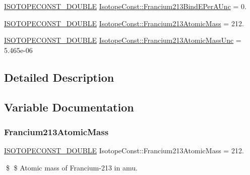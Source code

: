 \begin{DoxyCompactItemize}
\mbox{\hyperlink{group___isotope_const-_macros_ga8f45a7272ce02c0b4c65c44636ed719a}{I\+S\+O\+T\+O\+P\+E\+C\+O\+N\+S\+T\+\_\+\+D\+O\+U\+B\+LE}} \mbox{\hyperlink{group___isotope_const-_francium-_fr213_gad89a4eb2699a269c22ce779ab6a8e75a}{Isotope\+Const\+::\+Francium213\+Bind\+E\+Per\+A\+Unc}} = 0.
\item 
\mbox{\hyperlink{group___isotope_const-_macros_ga8f45a7272ce02c0b4c65c44636ed719a}{I\+S\+O\+T\+O\+P\+E\+C\+O\+N\+S\+T\+\_\+\+D\+O\+U\+B\+LE}} \mbox{\hyperlink{group___isotope_const-_francium-_fr213_ga805c92c86ed7ff7be7f1b51050e8eedf}{Isotope\+Const\+::\+Francium213\+Atomic\+Mass}} = 212.
\item 
\mbox{\hyperlink{group___isotope_const-_macros_ga8f45a7272ce02c0b4c65c44636ed719a}{I\+S\+O\+T\+O\+P\+E\+C\+O\+N\+S\+T\+\_\+\+D\+O\+U\+B\+LE}} \mbox{\hyperlink{group___isotope_const-_francium-_fr213_gaddc0fee1bef2b123c4b703dc1e353e33}{Isotope\+Const\+::\+Francium213\+Atomic\+Mass\+Unc}} = 5.\+465e-\/06
\end{DoxyCompactItemize}


\subsection{Detailed Description}


\subsection{Variable Documentation}
\mbox{\label{group___isotope_const-_francium-_fr213_ga805c92c86ed7ff7be7f1b51050e8eedf}} 
\subsubsection{\texorpdfstring{Francium213\+Atomic\+Mass}{Francium213AtomicMass}}
{\footnotesize\ttfamily \mbox{\hyperlink{group___isotope_const-_macros_ga8f45a7272ce02c0b4c65c44636ed719a}{I\+S\+O\+T\+O\+P\+E\+C\+O\+N\+S\+T\+\_\+\+D\+O\+U\+B\+LE}} Isotope\+Const\+::\+Francium213\+Atomic\+Mass = 212.}

\$ \$ Atomic mass of Francium-\/213 in amu. \mbox{\label{group___isotope_const-_francium-_fr213_gaddc0fee1bef2b123c4b703dc1e353e33}} 
